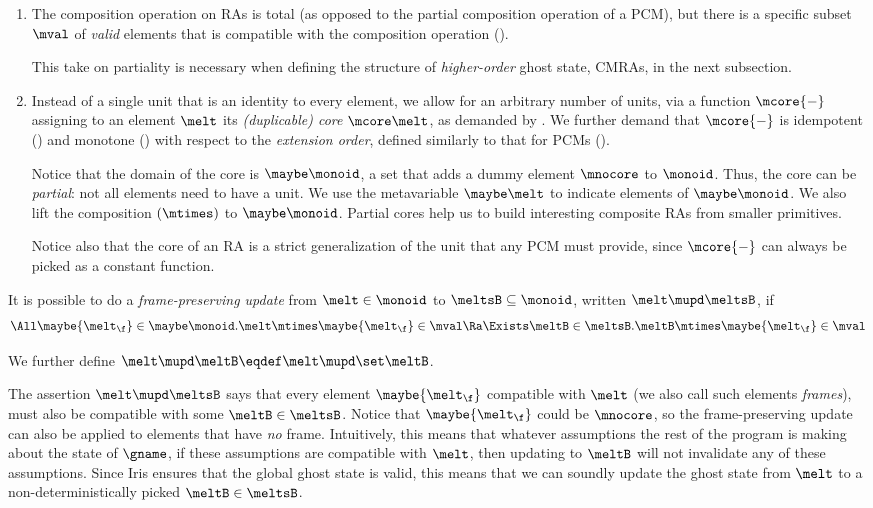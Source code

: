 \begin{enumerate}
\item The composition operation on RAs is total (as opposed to the partial composition operation of a PCM), but there is a specific subset $\mval$ of \emph{valid} elements that is compatible with the composition operation ().

This take on partiality is necessary when defining the structure of \emph{higher-order} ghost state, CMRAs, in the next subsection.

\item Instead of a single unit that is an identity to every element, we allow
for an arbitrary number of units, via a function $\mcore{{-}}$ assigning to an element $\melt$ its \emph{(duplicable) core} $\mcore\melt$, as demanded by .
  We further demand that $\mcore{{-}}$ is idempotent () and monotone () with respect to the \emph{extension order}, defined similarly to that for PCMs ().

  Notice that the domain of the core is $\maybe\monoid$, a set that adds a dummy element $\mnocore$ to $\monoid$.
  Thus, the core can be \emph{partial}: not all elements need to have a unit.
  We use the metavariable $\maybe\melt$ to indicate elements of  $\maybe\monoid$.
  We also lift the composition $(\mtimes)$ to $\maybe\monoid$.
  Partial cores help us to build interesting composite RAs from smaller primitives.

Notice also that the core of an RA is a strict generalization of the unit that any PCM must provide, since $\mcore{{-}}$ can always be picked as a constant function.
\end{enumerate}


\begin{defn}
  It is possible to do a \emph{frame-preserving update} from $\melt \in \monoid$ to $\meltsB \subseteq \monoid$, written $\melt \mupd \meltsB$, if
  \[ \All \maybe{\melt_\f} \in \maybe\monoid. \melt \mtimes \maybe{\melt_\f} \in \mval \Ra \Exists \meltB \in \meltsB. \meltB \mtimes \maybe{\melt_\f} \in \mval \]

  We further define $\melt \mupd \meltB \eqdef \melt \mupd \set\meltB$.
\end{defn}
The assertion $\melt \mupd \meltsB$ says that every element $\maybe{\melt_\f}$ compatible with $\melt$ (we also call such elements \emph{frames}), must also be compatible with some $\meltB \in \meltsB$.
Notice that $\maybe{\melt_\f}$ could be $\mnocore$, so the frame-preserving update can also be applied to elements that have \emph{no} frame.
Intuitively, this means that whatever assumptions the rest of the program is making about the state of $\gname$, if these assumptions are compatible with $\melt$, then updating to $\meltB$ will not invalidate any of these assumptions.
Since Iris ensures that the global ghost state is valid, this means that we can soundly update the ghost state from $\melt$ to a non-deterministically picked $\meltB \in \meltsB$.

